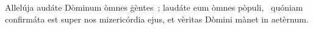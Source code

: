 { Allelúja}
{%
audáte Dòminum òmnes ġèntes~; laudáte eum òmnes pòpuli, 
~quóniam confirmáta est super nos mizericórdia ejus, et vèritas Dòmini mànet in aetèrnum. 
}
